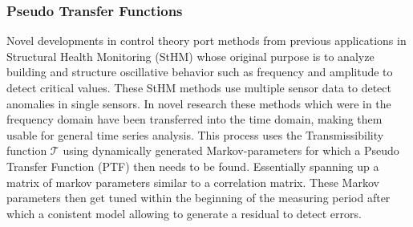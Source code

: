 \subsubsection{Pseudo Transfer Functions}


Novel developments in control theory port methods from previous applications in Structural Health Monitoring (StHM) whose original purpose is to analyze building and structure oscillative behavior such as frequency and amplitude to detect critical values. These StHM methods use multiple sensor data to detect anomalies in single sensors. In novel research these methods which were in the frequency domain have been transferred into the time domain, making them usable for general time series analysis. This process uses the Transmissibility function $\mathcal{T}$ using dynamically generated Markov-parameters for which a Pseudo Transfer Function (PTF) then needs to be found. Essentially spanning up a matrix of markov parameters similar to a correlation matrix. These Markov parameters then get tuned within the beginning of the measuring period after which a conistent model allowing to generate a residual to detect errors. \cite{khalil_transmissibility-based_2022, khalil_transmissibility-based_2022-1, wolter_anwendung_2014}

